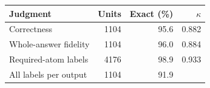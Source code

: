 \begin{tabular}{lrrr}
\toprule
Judgment & Units & Exact (\%) & $\kappa$ \\
\midrule
Correctness & 1104 & 95.6 & 0.882 \\
Whole-answer fidelity & 1104 & 96.0 & 0.884 \\
Required-atom labels & 4176 & 98.9 & 0.933 \\
All labels per output & 1104 & 91.9 & \textemdash{} \\
\bottomrule
\end{tabular}
